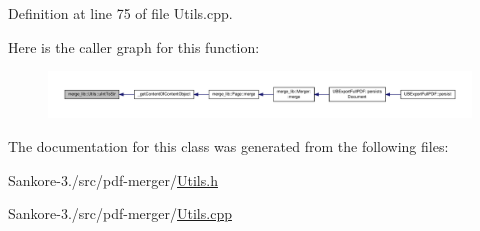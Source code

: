 Definition at line 75 of file Utils.\-cpp.



Here is the caller graph for this function\-:
\nopagebreak
\begin{figure}[H]
\begin{center}
\leavevmode
\includegraphics[width=350pt]{d4/d67/classmerge__lib_1_1_utils_aec498be127dfac5839795ea5d07d84c6_icgraph}
\end{center}
\end{figure}




The documentation for this class was generated from the following files\-:\begin{DoxyCompactItemize}
\item 
Sankore-\/3./src/pdf-\/merger/\hyperlink{_utils_8h}{Utils.\-h}\item 
Sankore-\/3./src/pdf-\/merger/\hyperlink{_utils_8cpp}{Utils.\-cpp}\end{DoxyCompactItemize}
